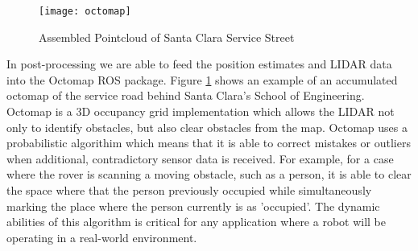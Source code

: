 \begin{figure}[H]
	\centerline{\texttt{[image: octomap]}}
	\caption[]{Assembled Pointcloud of Santa Clara Service Street}
	\label{fig:octomap}
\end{figure}

In post-processing we are able to feed the position estimates and LIDAR data into the Octomap ROS package. Figure \ref{fig:octomap} shows an example of an accumulated octomap of the service road behind Santa Clara's School of Engineering. Octomap is a 3D occupancy grid implementation which allows the LIDAR not only to identify obstacles, but also clear obstacles from the map. Octomap uses a probabilistic algorithim which means that it is able to correct mistakes or outliers when additional, contradictory sensor data is received. For example, for a case where the rover is scanning a moving obstacle, such as a person, it is able to clear the space where that the person previously occupied while simultaneously marking the place where the person currently is as 'occupied'. The dynamic abilities of this algorithm is critical for any application where a robot will be operating in a real-world environment.

